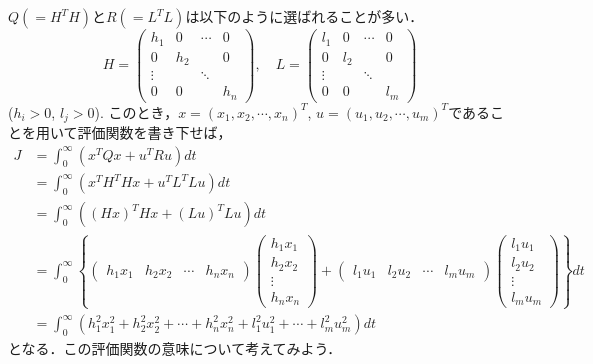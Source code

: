 $Q(=H^T H)$と$R(=L^T L)$は以下のように選ばれることが多い．
\begin{equation}
 H = \left(\begin{array}{cccc}
            h_1    & 0   & \cdots & 0 \\
	    0      & h_2 &        & 0 \\
	    \vdots &     & \ddots & \\
	    0      & 0   &        & h_n 
	   \end{array}\right)
 , \quad
 L = \left(\begin{array} {cccc}
            l_1    & 0   & \cdots & 0 \\
	    0      & l_2 &        & 0 \\
	    \vdots &     & \ddots & \\
	    0      & 0   &        & l_m 
	   \end{array}\right)
\end{equation}
($h_i>0$, $l_j>0$). このとき，$x = (x_1, x_2, \cdots, x_n)^T$, $u = (u_1, u_2, \cdots, u_m)^T$であることを用いて評価関数を書き下せば，
\begin{align}
 J
 &= \int_{0}^{\infty} (x^T Q x + u^T R u) dt \nonumber \\
 &= \int_{0}^{\infty} (x^T H^TH x + u^T L^TL u) dt \nonumber \\
 &= \int_{0}^{\infty} ((Hx)^TH x + (Lu)^TL u) dt \nonumber \\
 &= \int_{0}^{\infty}
    \left\{
    \left(
    \begin{array}{cccc}
     h_1x_1 & h_2x_2 & \cdots & h_nx_n
    \end{array}
    \right)
    \left(
    \begin{array}{c}
     h_1x_1 \\
     h_2x_2 \\
     \vdots \\
     h_nx_n
    \end{array}
    \right) +
    \left(
    \begin{array}{cccc}
     l_1u_1 & l_2u_2 & \cdots & l_mu_m
    \end{array}
    \right)
    \left(
    \begin{array}{c}
     l_1u_1 \\
     l_2u_2 \\
     \vdots \\
     l_mu_m
    \end{array}
    \right)
    \right\}dt \nonumber \\
 &= \int_0^{\infty} (h_1^2 x_1^2 + h_2^2 x_2^2 + \cdots +
     h_n^2 x_n^2 + l_1^2 u_1^2 + \cdots + l_m^2 u_m^2)dt
\label{eqn:P-index2}
\end{align}
となる．この評価関数の意味について考えてみよう．

